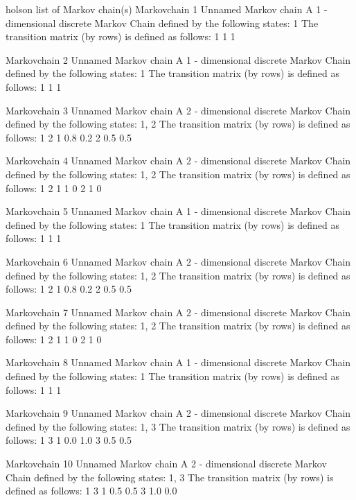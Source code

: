 \documentclass[
  nojss]{jss}
\begin{document}
\begin{CodeChunk}


\begin{CodeOutput}
holson  list of Markov chain(s) 
Markovchain  1 
Unnamed Markov chain 
 A  1 - dimensional discrete Markov Chain defined by the following states: 
 1 
 The transition matrix  (by rows)  is defined as follows: 
  1
1 1

Markovchain  2 
Unnamed Markov chain 
 A  1 - dimensional discrete Markov Chain defined by the following states: 
 1 
 The transition matrix  (by rows)  is defined as follows: 
  1
1 1

Markovchain  3 
Unnamed Markov chain 
 A  2 - dimensional discrete Markov Chain defined by the following states: 
 1, 2 
 The transition matrix  (by rows)  is defined as follows: 
    1   2
1 0.8 0.2
2 0.5 0.5

Markovchain  4 
Unnamed Markov chain 
 A  2 - dimensional discrete Markov Chain defined by the following states: 
 1, 2 
 The transition matrix  (by rows)  is defined as follows: 
  1 2
1 1 0
2 1 0

Markovchain  5 
Unnamed Markov chain 
 A  1 - dimensional discrete Markov Chain defined by the following states: 
 1 
 The transition matrix  (by rows)  is defined as follows: 
  1
1 1

Markovchain  6 
Unnamed Markov chain 
 A  2 - dimensional discrete Markov Chain defined by the following states: 
 1, 2 
 The transition matrix  (by rows)  is defined as follows: 
    1   2
1 0.8 0.2
2 0.5 0.5

Markovchain  7 
Unnamed Markov chain 
 A  2 - dimensional discrete Markov Chain defined by the following states: 
 1, 2 
 The transition matrix  (by rows)  is defined as follows: 
  1 2
1 1 0
2 1 0

Markovchain  8 
Unnamed Markov chain 
 A  1 - dimensional discrete Markov Chain defined by the following states: 
 1 
 The transition matrix  (by rows)  is defined as follows: 
  1
1 1

Markovchain  9 
Unnamed Markov chain 
 A  2 - dimensional discrete Markov Chain defined by the following states: 
 1, 3 
 The transition matrix  (by rows)  is defined as follows: 
    1   3
1 0.0 1.0
3 0.5 0.5

Markovchain  10 
Unnamed Markov chain 
 A  2 - dimensional discrete Markov Chain defined by the following states: 
 1, 3 
 The transition matrix  (by rows)  is defined as follows: 
    1   3
1 0.5 0.5
3 1.0 0.0


\end{CodeOutput}
\end{CodeChunk}
\end{document}
